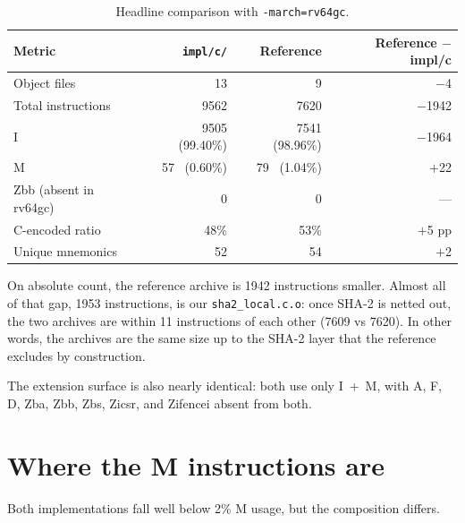 \documentclass[11pt,a4paper]{article}
\begin{document}
\begin{table}[ht]
\centering
\caption{Headline comparison with \texttt{-march=rv64gc}.}
\label{tab:headline}
\begin{tabular}{@{}lrrr@{}}
\toprule
Metric                        & \texttt{impl/c/}      & Reference     & Reference $-$ impl/c \\
\midrule
Object files                  & 13                    & 9             & $-$4 \\
Total instructions            & 9562                  & 7620          & $-$1942 \\
\quad I                       & 9505 \ (99.40\%)      & 7541 \ (98.96\%) & $-$1964 \\
\quad M                       &   57 \ (0.60\%)       &   79 \ (1.04\%)  & $+$22 \\
\quad Zbb (absent in rv64gc)  &    0                  &    0          & --- \\
C-encoded ratio               &   48\%                &   53\%         & $+$5 pp \\
Unique mnemonics              &   52                  &   54           & $+$2 \\
\bottomrule
\end{tabular}
\end{table}

On absolute count, the reference archive is 1942 instructions smaller.
Almost all of that gap, 1953 instructions, is our
\texttt{sha2\_local.c.o}: once SHA-2 is netted out, the two archives
are within 11 instructions of each other (7609 vs 7620).  In other
words, the archives are the same size up to the SHA-2 layer that the
reference excludes by construction.

The extension surface is also nearly identical: both use only I~+~M,
with A, F, D, Zba, Zbb, Zbs, Zicsr, and Zifencei absent from both.

\section{Where the M instructions are}

Both implementations fall well below 2\% M usage, but the composition
differs.
\end{document}
